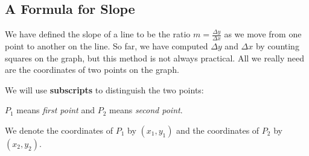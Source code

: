 \documentclass[10pt,]{book}
\newcommand{\terminology}[1]{\textbf{#1}}
\theoremstyle{plain}
\theoremstyle{definition}
\theoremstyle{definition}
\theoremstyle{definition}
\theoremstyle{definition}
\numberwithin{equation}{part}
\begin{document}
\subsection[{A Formula for Slope}]{A Formula for Slope}\label{subsection-26}
We have defined the slope of a line to be the ratio \(m = \frac{\Delta y}{\Delta x}\) as we move from one point to another on the line. So far, we have computed \(\Delta y\) and \(\Delta x\) by counting squares on the graph, but this method is not always practical. All we really need are the coordinates of two points on the graph.%
\par
We will use \terminology{subscripts} to distinguish the two points:%
\par
\(P_1\) means \emph{first point} and \(P_2\) means \emph{second point}.%
\par
We denote the coordinates of \(P_1\) by \((x_1, y_1)\) and the coordinates of \(P_2\) by \((x_2, y_2)\).%
\end{document}
